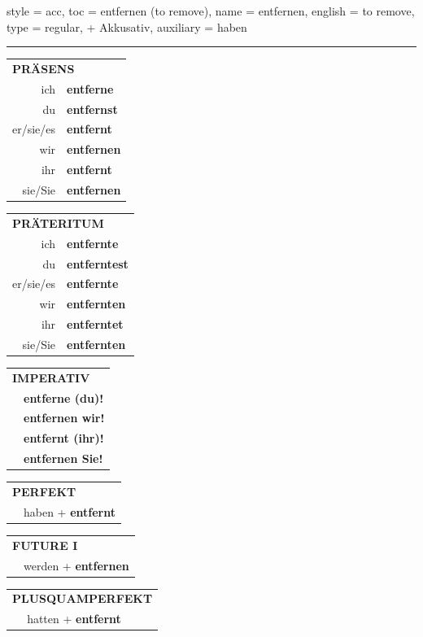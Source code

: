 \begin{verbentry}{
  style = {acc},
  toc = {entfernen (to remove)},
  name = {entfernen},
  english = {to remove},
  type = {regular, + Akkusativ},
  auxiliary = {haben}
}


\vspace{5pt}
\hrule
\vspace{5pt}

\begin{tabular}{rl}
\multicolumn{2}{l}{\textbf{PRÄSENS}}\\
ich & \textbf{entferne}\\
du & \textbf{entfernst}\\
er/sie/es & \textbf{entfernt}\\
wir & \textbf{entfernen}\\
ihr & \textbf{entfernt}\\
sie/Sie & \textbf{entfernen}\\
\end{tabular}
\hfill
\begin{tabular}{rl}
\multicolumn{2}{l}{\textbf{PRÄTERITUM}}\\
ich & \textbf{entfernte}\\
du & \textbf{entferntest}\\
er/sie/es & \textbf{entfernte}\\
wir & \textbf{entfernten}\\
ihr & \textbf{entferntet}\\
sie/Sie & \textbf{entfernten}\\
\end{tabular}
\hfill
\begin{tabular}{rl}
\multicolumn{2}{l}{\textbf{IMPERATIV}}\\
& \textbf{entferne (du)!}\\
& \textbf{entfernen wir!}\\
& \textbf{entfernt (ihr)!}\\
& \textbf{entfernen Sie!}\\
\end{tabular}

\vspace{10pt}

\begin{tabular}{rl}
\multicolumn{2}{l}{\textbf{PERFEKT}}\\
& haben + \textbf{entfernt}\\
\end{tabular}
\hfill
\begin{tabular}{rl}
\multicolumn{2}{l}{\textbf{FUTURE I}}\\
& werden + \textbf{entfernen}\\
\end{tabular}
\hfill
\begin{tabular}{rl}
\multicolumn{2}{l}{\textbf{PLUSQUAMPERFEKT}}\\
& hatten + \textbf{entfernt}\\
\end{tabular}


\end{verbentry}
